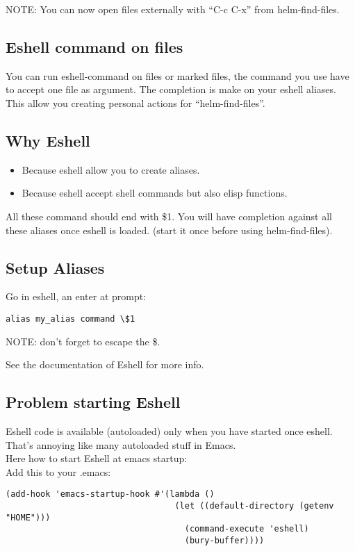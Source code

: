 \documentclass[a4paper,11pt]{article}
\begin{document}
NOTE: You can now open files externally with ``C-c C-x'' from helm-find-files.

\subsection{Eshell command on files}
\label{sec:eshell-command-files}
You can run eshell-command on files or marked files, the command you use have to accept
one file as argument.
The completion is make on your eshell aliases.
This allow you creating personal actions for ``helm-find-files''.

\subsection{Why Eshell}
\label{sec:why-eshell}
\begin{itemize}
\item Because eshell allow you to create aliases.
\end{itemize}
\begin{itemize}
\item Because eshell accept shell commands but also elisp functions.
\end{itemize}
All these command should end with \$1.
You will have completion against all these aliases once eshell is loaded.
(start it once before using helm-find-files).

\subsection{Setup Aliases}
\label{sec:setup-aliases}
Go in eshell, an enter at prompt:
\begin{verbatim}
alias my_alias command \$1
\end{verbatim}
NOTE: don't forget to escape the \$.

See the documentation of Eshell for more info.

\subsection{Problem starting Eshell}
\label{sec:probl-start-eshell}
Eshell code is available (autoloaded) only when you have started once eshell.
That's annoying like many autoloaded stuff in Emacs.\\

Here how to start Eshell at emacs startup:\\

Add this to your .emacs:
\begin{verbatim}
(add-hook 'emacs-startup-hook #'(lambda ()
                                  (let ((default-directory (getenv "HOME")))
                                    (command-execute 'eshell)
                                    (bury-buffer))))

\end{verbatim}
 
\end{document}
